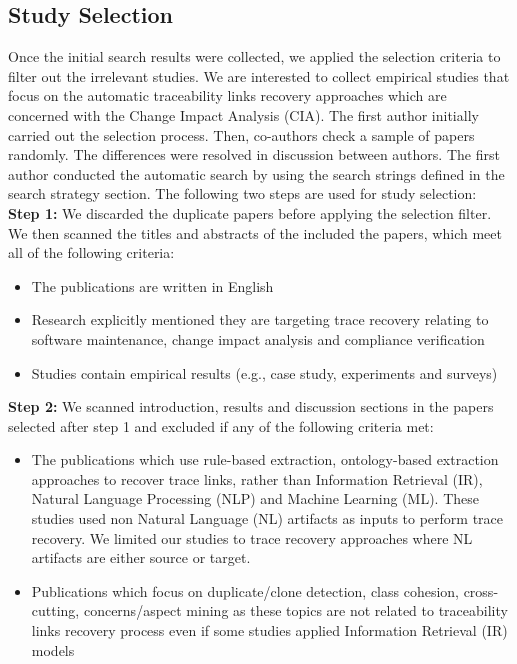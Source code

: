\documentclass[conference]{IEEEtran}
\begin{document}
\subsection{Study Selection}
Once the initial search results were collected, we applied the selection criteria to filter out the irrelevant studies. We are interested to collect empirical studies that focus on the automatic traceability links recovery approaches which are concerned with the Change Impact Analysis (CIA). The first author initially carried out the selection process.
Then, co-authors check a sample of papers randomly. The differences were resolved in discussion between authors. The first author conducted the automatic search by using the search strings defined in the search strategy section. The following two steps are used for study selection: 
\newline\textbf{Step 1: }We discarded the duplicate papers before applying the selection filter. We then scanned the titles and abstracts of the included the papers, which meet all of the following criteria: 
\begin{itemize}
\item The publications are written in English
\item Research explicitly mentioned they are targeting trace recovery relating to software maintenance, change impact analysis and compliance verification 
\item Studies contain empirical results (e.g., case study, experiments and surveys)
\end{itemize}
\textbf{Step 2:} We scanned introduction, results and discussion sections in the papers selected after step 1 and excluded if any of the following criteria met:
\begin{itemize}
\item The publications which use rule-based extraction, ontology-based extraction approaches to recover trace links, rather than Information Retrieval (IR), Natural Language Processing (NLP) and Machine Learning (ML). These studies used non Natural Language (NL) artifacts as inputs to perform trace recovery. We limited our studies to trace recovery approaches where NL artifacts are either source or target.
\item Publications which focus on duplicate/clone detection, class cohesion, cross-cutting, concerns/aspect mining as these topics are not related to traceability links recovery process even if some studies applied Information Retrieval (IR) models
\end{itemize}
\end{document}
